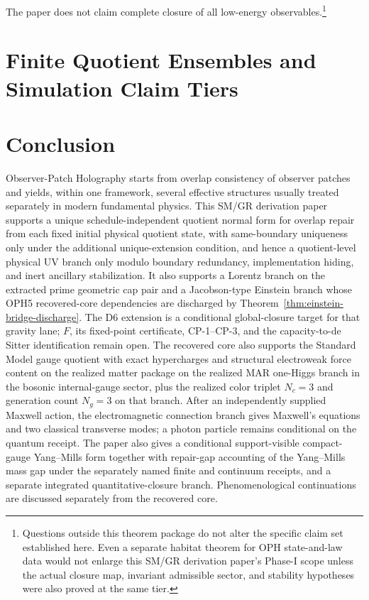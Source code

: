 \documentclass[11pt]{article}
\begin{document}
The paper does not claim complete closure of all low-energy observables.\footnote{Questions outside this theorem package do not alter the specific claim set established here. Even a separate habitat theorem for OPH state-and-law data would not enlarge this SM/GR derivation paper's Phase-I scope unless the actual closure map, invariant admissible sector, and stability hypotheses were also proved at the same tier.}
\section{Finite Quotient Ensembles and Simulation Claim Tiers}



\section{Conclusion}

Observer-Patch Holography starts from overlap consistency of observer patches and yields, within one framework, several effective structures usually treated separately in modern fundamental physics. This SM/GR derivation paper supports a unique schedule-independent quotient normal form for overlap repair from each fixed initial physical quotient state, with same-boundary uniqueness only under the additional unique-extension condition, and hence a quotient-level physical UV branch only modulo boundary redundancy, implementation hiding, and inert ancillary stabilization. It also supports a Lorentz branch on the extracted prime geometric cap pair and a Jacobson-type Einstein branch whose OPH5 recovered-core dependencies are discharged by Theorem~\ref{thm:einstein-bridge-discharge}. The D6 extension is a conditional global-closure target for that gravity lane; \(F\), its fixed-point certificate, CP-1--CP-3, and the capacity-to-de Sitter identification remain open. The recovered core also supports the Standard Model gauge quotient with exact hypercharges and structural electroweak force content on the realized matter package on the realized MAR one-Higgs branch in the bosonic internal-gauge sector, plus the realized color triplet \(N_c=3\) and generation count \(N_g=3\) on that branch. After an independently supplied Maxwell action, the electromagnetic connection branch gives Maxwell's equations and two classical transverse modes; a photon particle remains conditional on the quantum receipt. The paper also gives a conditional support-visible compact-gauge Yang--Mills form together with repair-gap accounting of the Yang--Mills mass gap under the separately named finite and continuum receipts, and a separate integrated quantitative-closure branch. Phenomenological continuations are discussed separately from the recovered core.
\end{document}
